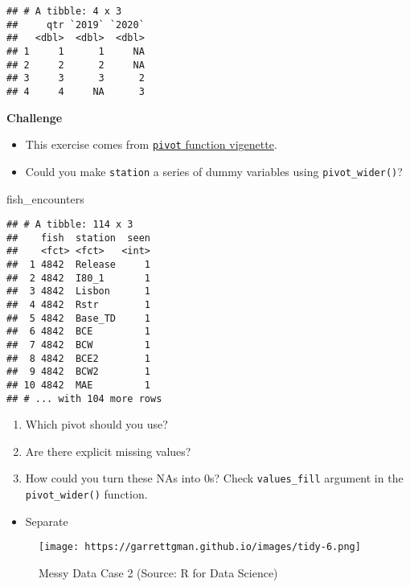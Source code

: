 \documentclass[
]{book}
\newenvironment{Shaded}{\begin{snugshade}}{\end{snugshade}}
\newcommand{\NormalTok}[1]{#1}
\providecommand{\tightlist}{%
  \setlength{\itemsep}{0pt}\setlength{\parskip}{0pt}}
\begin{document}
\begin{verbatim}
## # A tibble: 4 x 3
##     qtr `2019` `2020`
##   <dbl>  <dbl>  <dbl>
## 1     1      1     NA
## 2     2      2     NA
## 3     3      3      2
## 4     4     NA      3
\end{verbatim}

\textbf{Challenge}

\begin{itemize}
\item
  This exercise comes from \href{https://tidyr.tidyverse.org/articles/pivot.html}{\texttt{pivot} function vigenette}.
\item
  Could you make \texttt{station} a series of dummy variables using \texttt{pivot\_wider()}?
\end{itemize}

\begin{Shaded}
\begin{Highlighting}[]
\NormalTok{fish\_encounters}
\end{Highlighting}
\end{Shaded}

\begin{verbatim}
## # A tibble: 114 x 3
##    fish  station  seen
##    <fct> <fct>   <int>
##  1 4842  Release     1
##  2 4842  I80_1       1
##  3 4842  Lisbon      1
##  4 4842  Rstr        1
##  5 4842  Base_TD     1
##  6 4842  BCE         1
##  7 4842  BCW         1
##  8 4842  BCE2        1
##  9 4842  BCW2        1
## 10 4842  MAE         1
## # ... with 104 more rows
\end{verbatim}

\begin{enumerate}
\def\labelenumi{\arabic{enumi}.}
\item
  Which pivot should you use?
\item
  Are there explicit missing values?
\item
  How could you turn these NAs into 0s? Check \texttt{values\_fill} argument in the \texttt{pivot\_wider()} function.
\end{enumerate}

\begin{itemize}
\tightlist
\item
  Separate
\end{itemize}

\begin{figure}
\centering
\texttt{[image: https://garrettgman.github.io/images/tidy-6.png]}
\caption{Messy Data Case 2 (Source: R for Data Science)}
\end{figure}
\end{document}
